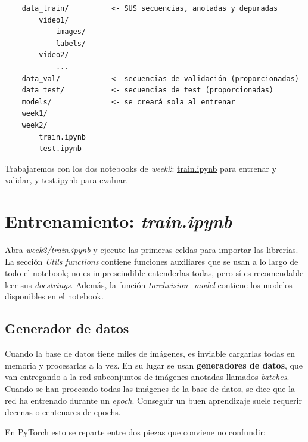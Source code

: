 \documentclass[12pt,a4paper]{article}
\begin{document}
\begin{verbatim}
    data_train/          <- SUS secuencias, anotadas y depuradas
        video1/
            images/
            labels/
        video2/
            ...
    data_val/            <- secuencias de validación (proporcionadas)
    data_test/           <- secuencias de test (proporcionadas)
    models/              <- se creará sola al entrenar
    week1/
    week2/
        train.ipynb
        test.ipynb
\end{verbatim}

Trabajaremos con los dos notebooks de \textit{week2}: \underline{train.ipynb} para entrenar y validar, y \underline{test.ipynb} para evaluar.

\section{Entrenamiento: \textit{train.ipynb}}
\label{sec:semana2-train}

Abra \textit{week2/train.ipynb} y ejecute las primeras celdas para importar las librerías. La sección \textit{Utils functions} contiene funciones auxiliares que se usan a lo largo de todo el notebook; no es imprescindible entenderlas todas, pero sí es recomendable leer sus \textit{docstrings}. Además, la función \textit{torchvision\_model} contiene los modelos disponibles en el notebook.

\subsection{Generador de datos}
\label{sec:semana2-data}

Cuando la base de datos tiene miles de imágenes, es inviable cargarlas todas en memoria y procesarlas a la vez. En su lugar se usan \textbf{generadores de datos}, que van entregando a la red subconjuntos de imágenes anotadas llamados \textit{batches}. Cuando se han procesado todas las imágenes de la base de datos, se dice que la red ha entrenado durante un \textit{epoch}. Conseguir un buen aprendizaje suele requerir decenas o centenares de epochs.

En PyTorch esto se reparte entre dos piezas que conviene no confundir:
\end{document}
